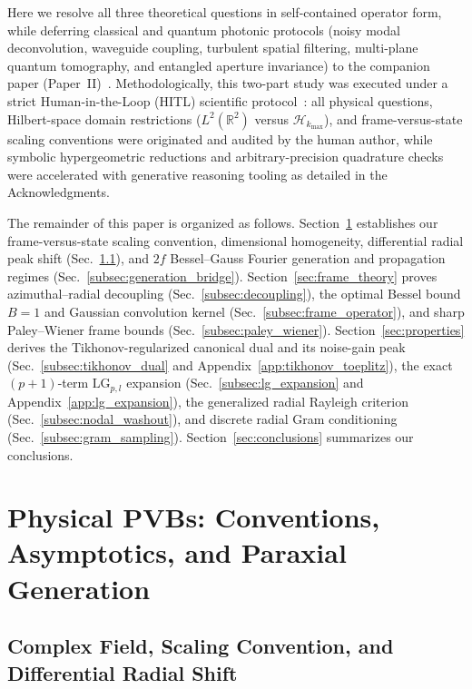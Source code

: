 \documentclass[aps,pra,reprint,nofootinbib,floatfix,longbibliography]{revtex4-2}
\theoremstyle{remark}
\begin{document}
Here we resolve all three theoretical questions in self-contained operator form, while deferring classical and quantum photonic protocols (noisy modal deconvolution, waveguide coupling, turbulent spatial filtering, multi-plane quantum tomography, and entangled aperture invariance) to the companion paper (Paper~II)~\cite{AyalaPaperII}. Methodologically, this two-part study was executed under a strict Human-in-the-Loop (HITL) scientific protocol~\cite{Messeri2024,OToole2024,Chandra2026TheoPhysEval,Thorp2023Science,COPE2023AI}: all physical questions, Hilbert-space domain restrictions ($L^2(\mathbb{R}^2)$ versus $\mathcal{H}_{k_{\max}}$), and frame-versus-state scaling conventions were originated and audited by the human author, while symbolic hypergeometric reductions and arbitrary-precision quadrature checks were accelerated with generative reasoning tooling as detailed in the Acknowledgments.

The remainder of this paper is organized as follows. Section~\ref{sec:pvb_formation} establishes our frame-versus-state scaling convention, dimensional homogeneity, differential radial peak shift (Sec.~\ref{subsec:pvb_def}), and $2f$ Bessel--Gauss Fourier generation and propagation regimes (Sec.~\ref{subsec:generation_bridge}). Section~\ref{sec:frame_theory} proves azimuthal--radial decoupling (Sec.~\ref{subsec:decoupling}), the optimal Bessel bound $B = 1$ and Gaussian convolution kernel (Sec.~\ref{subsec:frame_operator}), and sharp Paley--Wiener frame bounds (Sec.~\ref{subsec:paley_wiener}). Section~\ref{sec:properties} derives the Tikhonov-regularized canonical dual and its noise-gain peak (Sec.~\ref{subsec:tikhonov_dual} and Appendix~\ref{app:tikhonov_toeplitz}), the exact $(p+1)$-term $\mathrm{LG}_{p,l}$ expansion (Sec.~\ref{subsec:lg_expansion} and Appendix~\ref{app:lg_expansion}), the generalized radial Rayleigh criterion (Sec.~\ref{subsec:nodal_washout}), and discrete radial Gram conditioning (Sec.~\ref{subsec:gram_sampling}). Section~\ref{sec:conclusions} summarizes our conclusions.

\section{Physical PVBs: Conventions, Asymptotics, and Paraxial Generation}
\label{sec:pvb_formation}

\subsection{Complex Field, Scaling Convention, and Differential Radial Shift}
\label{subsec:pvb_def}
\end{document}
